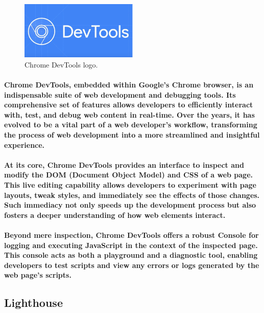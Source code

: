 \documentclass[12pt,a4paper]{article}
\begin{document}
    \begin{figure}[h!]
      \centering
      \includegraphics[width=0.5\textwidth]{devtools.png}
      \caption{Chrome DevTools logo.}
    \end{figure}
    
    \paragraph{Chrome DevTools, embedded within Google’s Chrome browser, is an indispensable suite of web development and debugging tools. Its comprehensive set of features allows developers to efficiently interact with, test, and debug web content in real-time. Over the years, it has evolved to be a vital part of a web developer’s workflow, transforming the process of web development into a more streamlined and insightful experience.}
    
    \paragraph{At its core, Chrome DevTools provides an interface to inspect and modify the DOM (Document Object Model) and CSS of a web page. This live editing capability allows developers to experiment with page layouts, tweak styles, and immediately see the effects of those changes. Such immediacy not only speeds up the development process but also fosters a deeper understanding of how web elements interact.}
    
    \paragraph{Beyond mere inspection, Chrome DevTools offers a robust Console for logging and executing JavaScript in the context of the inspected page. This console acts as both a playground and a diagnostic tool, enabling developers to test scripts and view any errors or logs generated by the web page’s scripts.}

    \subsection{Lighthouse}
\end{document}
